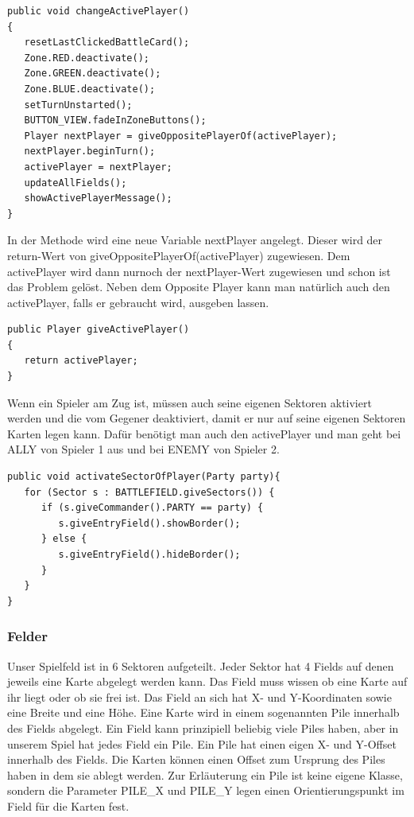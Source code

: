\begin{lstlisting}
public void changeActivePlayer()
{
   resetLastClickedBattleCard();
   Zone.RED.deactivate();
   Zone.GREEN.deactivate();
   Zone.BLUE.deactivate();
   setTurnUnstarted();
   BUTTON_VIEW.fadeInZoneButtons();
   Player nextPlayer = giveOppositePlayerOf(activePlayer);
   nextPlayer.beginTurn();
   activePlayer = nextPlayer;
   updateAllFields();
   showActivePlayerMessage();
}
\end{lstlisting}
In der Methode wird eine neue Variable nextPlayer angelegt. Dieser wird der return-Wert von giveOppositePlayerOf(activePlayer) zugewiesen. Dem activePlayer wird dann nurnoch der nextPlayer-Wert zugewiesen und schon ist das Problem gelöst.
Neben dem Opposite Player kann man natürlich auch den activePlayer, falls er gebraucht wird, ausgeben lassen.
\begin{lstlisting}
public Player giveActivePlayer()
{
   return activePlayer;
}
\end{lstlisting}
Wenn ein Spieler am Zug ist, müssen auch seine eigenen Sektoren aktiviert werden und die vom Gegener deaktiviert, damit er nur auf seine eigenen Sektoren Karten legen kann. Dafür benötigt man auch den activePlayer und man geht bei ALLY von Spieler 1 aus und bei ENEMY von Spieler 2.
\begin{lstlisting}
public void activateSectorOfPlayer(Party party){
   for (Sector s : BATTLEFIELD.giveSectors()) {
      if (s.giveCommander().PARTY == party) {
         s.giveEntryField().showBorder();
      } else {
         s.giveEntryField().hideBorder();
      }
   }
}
\end{lstlisting}

\subsubsection{Felder}
Unser Spielfeld ist in 6 Sektoren aufgeteilt. Jeder Sektor hat 4 Fields auf denen jeweils eine Karte abgelegt werden kann. Das Field muss wissen ob eine Karte auf ihr liegt oder ob sie frei ist. Das Field an sich hat X- und Y-Koordinaten sowie eine Breite und eine Höhe. Eine Karte wird in einem sogenannten Pile innerhalb des Fields abgelegt. Ein Field kann prinzipiell beliebig viele Piles haben, aber in unserem Spiel hat jedes Field ein Pile. Ein Pile hat einen eigen X- und Y-Offset innerhalb des Fields. Die Karten können einen Offset zum Ursprung des Piles haben in dem sie ablegt werden.
Zur Erläuterung ein Pile ist keine eigene Klasse, sondern die Parameter PILE\_X und PILE\_Y legen
einen Orientierungspunkt im Field für die Karten fest.

